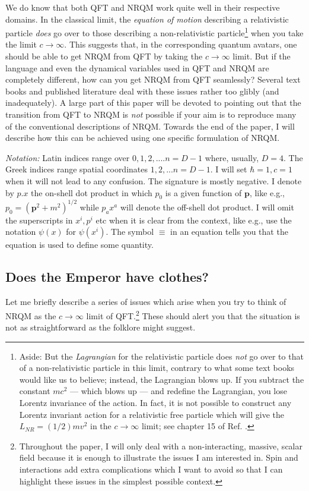 \documentclass[12pt]{article}
\begin{document}
We do know that  both QFT and NRQM work quite well in their  respective domains. In the classical limit, the \textit{equation of motion} describing a relativistic particle \textit{does} go over to those describing a non-relativistic particle\footnote{Aside: But the \textit{Lagrangian} for the relativistic particle does \textit{not} go over to that of a non-relativistic particle in this limit, contrary to what some text books would like us to believe; instead, the Lagrangian  blows up. If you subtract  the constant $mc^2$ --- which blows up --- and redefine the Lagrangian, you lose Lorentz invariance of the action. In fact, it is not possible to construct any Lorentz invariant action for a relativistic free particle which will give the $L_{NR}=(1/2)mv^2$ in the $c\to \infty$ limit; see chapter 15 of Ref. \cite{tpsbtp}.} when you take the limit $c\to \infty$. This suggests that, in the corresponding quantum avatars,  one should be able to get NRQM from QFT by taking the $c\to \infty$ limit. 
But if the language and even the dynamical variables used in QFT and NRQM are completely different, how can you get NRQM from QFT seamlessly?
 Several text books and published literature deal with these issues rather too glibly (and inadequately).   A large part of this paper will be devoted to pointing out that the transition from QFT to NRQM is \textit{not} possible if your aim is to reproduce many of the conventional descriptions of NRQM. Towards the end of the paper, I will describe how this can be achieved using one specific formulation of NRQM.
 
\textit{ Notation:} Latin indices range over $0,1,2,....n=D-1$ where, usually, $D=4$. The Greek indices range spatial coordinates $1,2,...n=D-1$. I will set $\hbar=1, c=1$ when it will not lead to any confusion. The signature is mostly negative. I denote by $p.x$ the on-shell dot product in which $p_0$ is a given function of $\bm{p}$, like e.g., $p_0=(\bm{p}^2+m^2)^{1/2}$ while $p_ax^a$ will denote the off-shell dot product. I will omit the superscripts in $x^i,p^i$ etc when it is clear from the context, like e.g., use the notation $\psi(x)$ for $\psi(x^i)$. 
The symbol $\equiv$ in an equation tells you that the equation is used to define some quantity.
 
 \subsection{Does the Emperor have clothes?}\label{sec:emperor}
 
Let me briefly describe a series of issues which arise when you try to think of NRQM as the $c\to\infty$ limit of QFT.\footnote{Throughout the paper, I will only deal with a non-interacting, massive, scalar field because it is enough to illustrate the issues I am interested in. Spin and interactions add extra complications which I want to avoid so that I can highlight these issues in the simplest possible context.} These should alert you that the situation is not as straightforward as the folklore might suggest. 
 
\end{document}
